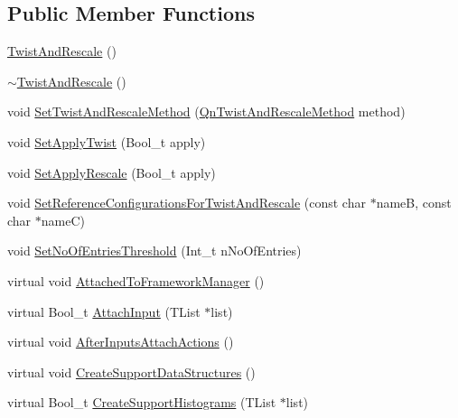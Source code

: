 \subsection*{Public Member Functions}
\begin{DoxyCompactItemize}
\item 
\mbox{\hyperlink{classQn_1_1TwistAndRescale_a4cf98e45c04dd1a2c31ba3e023a064e5}{Twist\+And\+Rescale}} ()
\item 
\mbox{\hyperlink{classQn_1_1TwistAndRescale_a93e2f5cdf87cfd5366e8b7acbc02623e}{$\sim$\+Twist\+And\+Rescale}} ()
\item 
void \mbox{\hyperlink{classQn_1_1TwistAndRescale_ab7a17c1330ba109472e4941ba44c3ad5}{Set\+Twist\+And\+Rescale\+Method}} (\mbox{\hyperlink{classQn_1_1TwistAndRescale_a04bae5b47174d3536e1f6ac8499b982f}{Qn\+Twist\+And\+Rescale\+Method}} method)
\item 
void \mbox{\hyperlink{classQn_1_1TwistAndRescale_a3b8c1bb7d3ef535904dc6705d6f152d9}{Set\+Apply\+Twist}} (Bool\+\_\+t apply)
\item 
void \mbox{\hyperlink{classQn_1_1TwistAndRescale_ace713dca5b5d051583aa6821d40a35b3}{Set\+Apply\+Rescale}} (Bool\+\_\+t apply)
\item 
void \mbox{\hyperlink{classQn_1_1TwistAndRescale_a63b6513ff899eb521921740dad3af9b2}{Set\+Reference\+Configurations\+For\+Twist\+And\+Rescale}} (const char $\ast$nameB, const char $\ast$nameC)
\item 
void \mbox{\hyperlink{classQn_1_1TwistAndRescale_a1180c7ea79d276d939ace45a61ebc76a}{Set\+No\+Of\+Entries\+Threshold}} (Int\+\_\+t n\+No\+Of\+Entries)
\item 
virtual void \mbox{\hyperlink{classQn_1_1TwistAndRescale_a75b3e7001fabda74adcf1441ffab1435}{Attached\+To\+Framework\+Manager}} ()
\item 
virtual Bool\+\_\+t \mbox{\hyperlink{classQn_1_1TwistAndRescale_af6ca5526d392329f6f35adcc261de349}{Attach\+Input}} (T\+List $\ast$list)
\item 
virtual void \mbox{\hyperlink{classQn_1_1TwistAndRescale_ab9f2ec874c828bc88d70232ae4ca8e63}{After\+Inputs\+Attach\+Actions}} ()
\item 
virtual void \mbox{\hyperlink{classQn_1_1TwistAndRescale_af28bb42098c1b3138769d1747f06468f}{Create\+Support\+Data\+Structures}} ()
\item 
virtual Bool\+\_\+t \mbox{\hyperlink{classQn_1_1TwistAndRescale_a57826092f0c09750fe0f5919e2cdb617}{Create\+Support\+Histograms}} (T\+List $\ast$list)
\item 

\end{DoxyCompactItemize}
